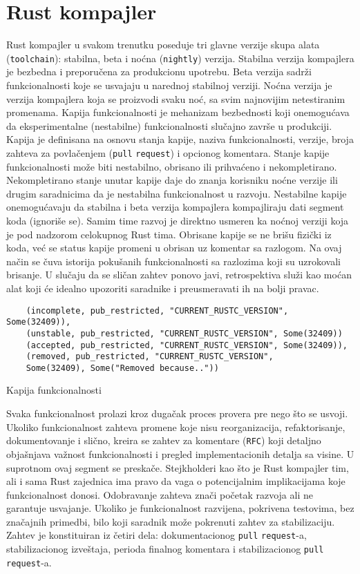 \section{Rust kompajler}

Rust kompajler u svakom trenutku poseduje tri glavne verzije skupa alata (\verb|toolchain|): stabilna, beta i noćna (\verb|nightly|) verzija.
Stabilna verzija kompajlera je bezbedna i preporučena za produkcionu upotrebu. Beta verzija sadrži funkcionalnosti
koje se usvajaju u narednoj stabilnoj verziji. Noćna verzija je verzija kompajlera koja se 
proizvodi svaku noć, sa svim najnovijim netestiranim promenama. Kapija funkcionalnosti je mehanizam bezbednosti
koji onemogućava da eksperimentalne (nestabilne) funkcionalnosti slučajno završe u produkciji. 
Kapija je definisana na osnovu stanja kapije, naziva funkcionalnosti, verzije, broja zahteva za povlačenjem
(\verb|pull| \verb|request|) i opcionog komentara.
Stanje kapije funkcionalnosti može biti nestabilno, obrisano ili prihvaćeno i nekompletirano. Nekompletirano 
stanje unutar kapije daje do znanja korisniku noćne verzije ili drugim saradnicima da je nestabilna funkcionalnost 
u razvoju.  Nestabilne kapije onemogućavaju da stabilna i beta verzija kompajlera kompajliraju 
dati segment koda (ignoriše se).  Samim time razvoj je direktno 
usmeren ka noćnoj verziji koja je pod nadzorom celokupnog Rust tima. Obrisane kapije se ne brišu fizički iz koda,
već se status kapije promeni u obrisan uz komentar sa razlogom. Na ovaj način se čuva istorija pokušanih 
funkcionalnosti sa razlozima koji su uzrokovali brisanje. U slučaju da se sličan zahtev ponovo javi, retrospektiva
služi kao moćan alat koji će idealno upozoriti saradnike i preusmeravati ih na bolji pravac.

\begin{listing}[H]
\begin{verbatim}
    (incomplete, pub_restricted, "CURRENT_RUSTC_VERSION", Some(32409)),
    (unstable, pub_restricted, "CURRENT_RUSTC_VERSION", Some(32409))
    (accepted, pub_restricted, "CURRENT_RUSTC_VERSION", Some(32409)),
    (removed, pub_restricted, "CURRENT_RUSTC_VERSION", 
    Some(32409), Some("Removed because.."))
\end{verbatim}
\caption{Kapija funkcionalnosti}
\label{lst:rustup_set}
\end{listing}

Svaka funkcionalnost prolazi kroz dugačak proces provera pre nego 
što se usvoji. Ukoliko funkcionalnost zahteva promene koje nisu reorganizacija, refaktorisanje, dokumentovanje
i slično, kreira se zahtev za komentare (\verb|RFC|) koji detaljno objašnjava važnost funkcionalnosti i 
pregled implementacionih detalja sa visine. U suprotnom ovaj segment se preskače. Stejkholderi kao što je Rust kompajler tim, ali i sama Rust zajednica 
ima pravo da vaga o potencijalnim implikacijama koje funkcionalnost donosi. Odobravanje zahteva znači početak 
razvoja ali ne garantuje usvajanje. Ukoliko je funkcionalnost razvijena, pokrivena testovima, 
bez značajnih primedbi, bilo koji saradnik može pokrenuti zahtev za stabilizaciju. Zahtev je konstituiran iz 
četiri dela: dokumentacionog \verb|pull| \verb|request|-a, stabilizacionog izveštaja, 
perioda finalnog komentara i stabilizacionog \verb|pull| \verb|request|-a.

